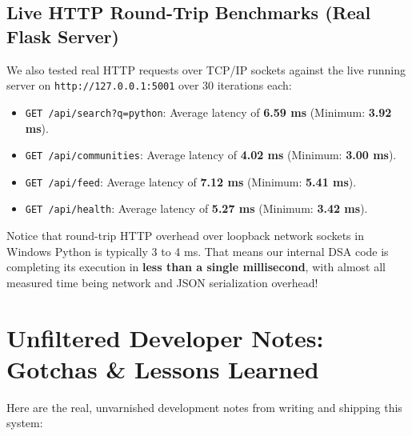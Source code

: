 \documentclass[11pt,a4paper]{article}
\begin{document}
\subsection{Live HTTP Round-Trip Benchmarks (Real Flask Server)}
We also tested real HTTP requests over TCP/IP sockets against the live running server on \texttt{http://127.0.0.1:5001} over 30 iterations each:

\begin{itemize}[leftmargin=1.5cm]
    \item \texttt{GET /api/search?q=python}: Average latency of \textbf{6.59 ms} (Minimum: \textbf{3.92 ms}).
    \item \texttt{GET /api/communities}: Average latency of \textbf{4.02 ms} (Minimum: \textbf{3.00 ms}).
    \item \texttt{GET /api/feed}: Average latency of \textbf{7.12 ms} (Minimum: \textbf{5.41 ms}).
    \item \texttt{GET /api/health}: Average latency of \textbf{5.27 ms} (Minimum: \textbf{3.42 ms}).
\end{itemize}

Notice that round-trip HTTP overhead over loopback network sockets in Windows Python is typically 3 to 4 ms. That means our internal DSA code is completing its execution in \textbf{less than a single millisecond}, with almost all measured time being network and JSON serialization overhead!

\section{Unfiltered Developer Notes: Gotchas \& Lessons Learned}

Here are the real, unvarnished development notes from writing and shipping this system:
\end{document}

